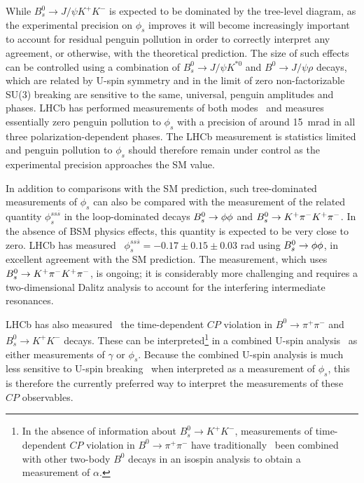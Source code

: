 While $B^0_s \to J/\psi K^+ K^-$ is expected to be dominated by the tree-level diagram,
as the experimental precision on $\phi_s$ improves it will become increasingly important
to account for residual penguin pollution in order to correctly interpret any agreement,
or otherwise, with the theoretical prediction. The size of such effects can be controlled
using a combination of $B^0_s \to J/\psi K^{*0}$ and $B^0 \to J/\psi \rho$ decays,
which are related by U-spin symmetry and in the limit of zero non-factorizable SU(3)
breaking are sensitive to the same, universal, penguin amplitudes and phases.
LHCb has performed measurements of both modes~\cite{LHCb-PAPER-2015-034,LHCb-PAPER-2014-058} and
measures essentially zero penguin pollution to $\phi_s$ with a precision of around 15~mrad
in all three polarization-dependent phases. The LHCb measurement is statistics limited
and penguin pollution to $\phi_s$ should therefore
remain under control as the experimental precision approaches the SM value.

In addition to comparisons with the SM prediction, such tree-dominated measurements of $\phi_s$ can also be compared with the measurement
of the related quantity $\phi_s^{ss\overline{s}}$ in the loop-dominated decays ${{B}^0_{s}} \rightarrow \phi\phi$ and ${{B}^0_{s}}\rightarrow {\ensuremath{{K}^+}}\pi^-{{K}^+}\pi^-$.
In the absence of BSM physics effects, this quantity is expected to be very close to zero.
LHCb has measured~\cite{LHCb-PAPER-2014-026} $\phi_s^{ss\overline{s}} = -0.17 \pm 0.15 \pm 0.03$ rad using
${{B}^0_{s}}\rightarrow \phi\phi$, in excellent agreement with the SM prediction. The measurement,
which uses ${{B}^0_{s}}\rightarrow {\ensuremath{{K}^+}}\pi^-{{K}^+}\pi^-$, is ongoing; it is considerably more challenging and
requires a two-dimensional Dalitz analysis to account
for the interfering intermediate resonances. 

LHCb has also measured~\cite{LHCb:2017ood} the time-dependent $CP$ violation in $B^0 \to \pi^+ \pi^-$ and $B^0_s \to K^+ K^-$ decays.
These can be interpreted\footnote{In the absence of information about $B^0_s \to K^+ K^-$, measurements of time-dependent $CP$ violation in
$B^0 \to \pi^+ \pi^-$ have traditionally~\cite{HFAG} been combined with other two-body $B^0$ decays in an isospin analysis to obtain a measurement of $\alpha$.}
in a combined U-spin analysis~\cite{Fleischer:1999pa} as either measurements of $\gamma$ or $\phi_s$.
Because the combined U-spin analysis is much less sensitive
to U-spin breaking~\cite{LHCb-PAPER-2014-045} when interpreted as a measurement of $\phi_s$, this is therefore the currently preferred way
to interpret the measurements of these $CP$ observables.

